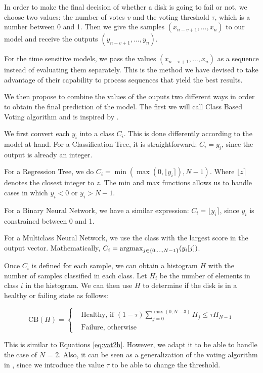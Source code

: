 In order to make the final decision of whether a disk is going to fail or not, we choose two values: the number of votes $v$ and the voting threshold $\tau$, which is a number between 0 and 1.
Then we give the samples $(x_{n-v+1},\dots,x_n)$ to our model and receive the outputs $(y_{n-v+1},\dots,y_n)$.

For the time sensitive models, we pass the values $(x_{n-v+1},\dots,x_n)$ as a sequence instead of evaluating them separately.
This is the method we have devised to take advantage of their capability to process sequences that yield the best results.

We then propose to combine the values of the ouputs two different ways in order to obtain the final prediction of the model.
The first we will call Class Based Voting algorithm and is inspired by \cite{Xu16}.

We first convert each $y_i$ into a class $C_i$.
This is done differently according to the model at hand.
For a Classification Tree, it is straightforward: $C_i = y_i$, since the output is already an integer.

For a Regression Tree, we do $C_i = \min(\max(0, \lfloor y_i \rceil), N-1)$.
Where $\lfloor z \rceil$ denotes the closest integer to $z$.
The min and max functions allows us to handle cases in which $y_i < 0$ or $y_i > N-1$.

For a Binary Neural Network, we have a similar expression: $C_i = \lfloor y_i \rceil$, since $y_i$ is constrained between 0 and 1.

For a Multiclass Neural Network, we use the class with the largest score in the output vector.
Mathematically, $C_i = \operatorname*{argmax}_{j\in\{0,\dots,N-1\}}(y_i[j])$.

Once $C_i$ is defined for each sample, we can obtain a histogram $H$ with the number of samples classified in each class.
Let $H_i$ be the number of elements in class $i$ in the histogram.
We can then use $H$ to determine if the disk is in a healthy or failing state as follows:

\begin{equation}\label{eq:class_based_voting}
    \text{CB}(H) = 
    \begin{cases}
        &\text{Healthy, if } (1-\tau)\sum_{j=0}^{\max(0,N-3)}H_j \leq \tau H_{N-1} \\
        & \text{Failure, otherwise} 
  \end{cases}
\end{equation}

This is similar to Equations \ref{eq:vat2h}.
However, we adapt it to be able to handle the case of $N$ = 2.
Also, it can be seen as a generalization of the voting algorithm in \cite{Li14}, since we introduce the value $\tau$ to be able to change the threshold.

